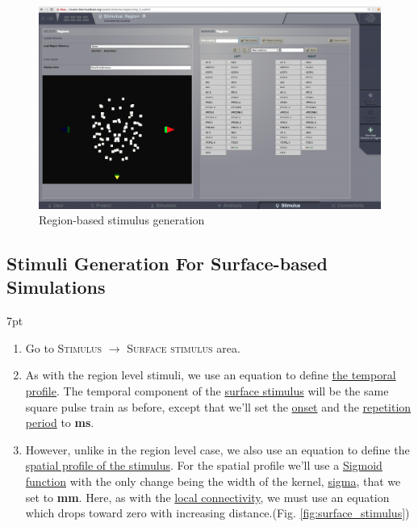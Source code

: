 \documentclass{tufte-handout}
\newenvironment{formal}{%
  \def\FrameCommand{%
    \hspace{1pt}%
    {\color{DarkBlue}\vrule width 2pt}%
    {\color{formalshade}\vrule width 4pt}%
    \colorbox{formalshade}%
  }%
  \MakeFramed{\advance\hsize-\width\FrameRestore}%
  \noindent\hspace{-4.55pt}%
  \begin{adjustwidth}{}{7pt}%
  \vspace{2pt}\vspace{2pt}%
}
{%
  \vspace{2pt}\end{adjustwidth}\endMakeFramed%
}
\begin{document}
\begin{figure}[h]
  \includegraphics[width=\linewidth]{Handout_UI_HeterogenousModelAndStimulation_StimulusRegionScaling}%
  \caption{Region-based stimulus generation}%
  \label{fig:save_scaling}%
\end{figure}


\newpage
\subsection{Stimuli Generation For Surface-based Simulations}\label{sec:surface_stim}

\begin{formal}
\begin{enumerate}
\item Go to \textsc{Stimulus} $\rightarrow$ \textsc{Surface stimulus} area. 
\item As with the region level stimuli, we use an equation to define \underline{the temporal
profile}. The temporal component of the \underline{surface stimulus} will be the same square pulse train as before, except that we'll set the \underline{onset} and the \underline{repetition period} to \textbf{\unit[50]{ms}}.
\item  However, unlike in the region level case, we also use an equation to
define the \underline{spatial profile of the stimulus}. For the spatial profile we'll use a \underline{Sigmoid function} with the only change being the width of the kernel, \underline{sigma}, that we set to \textbf{\unit[10]{mm}}.  Here, as with the \underline{local connectivity}, we
must use an equation which drops toward zero with increasing distance.(Fig. \ref{fig:surface_stimulus})
\end{enumerate}
\end{formal}
\end{document}
